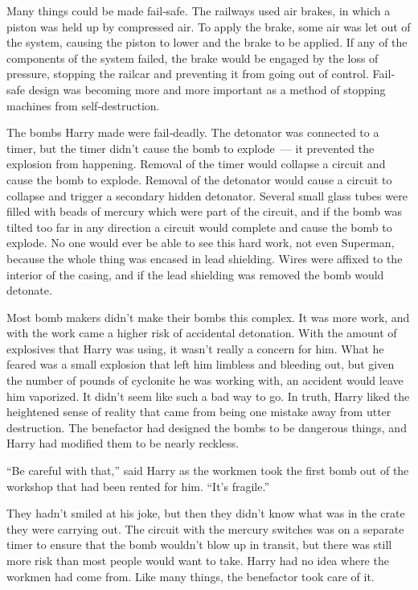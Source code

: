 \documentclass[ebook,12pt]{memoir}
\begin{document}
Many things could be made fail‐safe. The railways used air brakes, in
which a piston was held up by compressed air. To apply the brake, some
air was let out of the system, causing the piston to lower and the brake
to be applied. If any of the components of the system failed, the brake
would be engaged by the loss of pressure, stopping the railcar and
preventing it from going out of control. Fail‐safe design was becoming
more and more important as a method of stopping machines from
self‐destruction.

The bombs Harry made were fail‐deadly. The detonator was connected to a
timer, but the timer didn't cause the bomb to explode~--- it prevented
the explosion from happening. Removal of the timer would collapse a
circuit and cause the bomb to explode. Removal of the detonator would
cause a circuit to collapse and trigger a secondary hidden detonator.
Several small glass tubes were filled with beads of mercury which were
part of the circuit, and if the bomb was tilted too far in any direction
a circuit would complete and cause the bomb to explode. No one would
ever be able to see this hard work, not even Superman, because the whole
thing was encased in lead shielding. Wires were affixed to the interior
of the casing, and if the lead shielding was removed the bomb would
detonate.

Most bomb makers didn't make their bombs this complex. It was more work,
and with the work came a higher risk of accidental detonation. With the
amount of explosives that Harry was using, it wasn't really a concern
for him. What he feared was a small explosion that left him limbless and
bleeding out, but given the number of pounds of cyclonite he was working
with, an accident would leave him vaporized. It didn't seem like such a
bad way to go. In truth, Harry liked the heightened sense of reality
that came from being one mistake away from utter destruction. The
benefactor had designed the bombs to be dangerous things, and Harry had
modified them to be nearly reckless.

``Be careful with that,'' said Harry as the workmen took the first bomb
out of the workshop that had been rented for him. ``It's fragile.''

They hadn't smiled at his joke, but then they didn't know what was in
the crate they were carrying out. The circuit with the mercury switches
was on a separate timer to ensure that the bomb wouldn't blow up in
transit, but there was still more risk than most people would want to
take. Harry had no idea where the workmen had come from. Like many
things, the benefactor took care of it.
\end{document}
